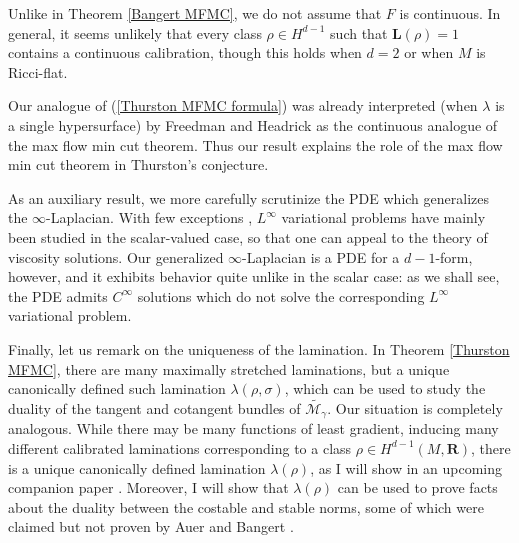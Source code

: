 \documentclass[reqno,11pt]{amsart}
\newcommand{\RR}{\mathbf{R}}
\newcommand{\Comass}{\mathbf L}
\theoremstyle{definition}
\numberwithin{equation}{section}
\begin{document}
Unlike in Theorem \ref{Bangert MFMC}, we do not assume that $F$ is continuous.
In general, it seems unlikely that every class $\rho \in H^{d - 1}$ such that $\Comass(\rho) = 1$ contains a continuous calibration, though this holds when $d = 2$ \cite{Evans08} or when $M$ is Ricci-flat.

Our analogue of (\ref{Thurston MFMC formula}) was already interpreted (when $\lambda$ is a single hypersurface) by Freedman and Headrick \cite{Freedman_2016} as the continuous analogue of the max flow min cut theorem.
Thus our result explains the role of the max flow min cut theorem in Thurston's conjecture.

As an auxiliary result, we more carefully scrutinize the PDE which generalizes the $\infty$-Laplacian.
With few exceptions \cite{Barron2001,Sheffield12,daskalopoulos2022}, $L^\infty$ variational problems have mainly been studied in the scalar-valued case, so that one can appeal to the theory of viscosity solutions.
Our generalized $\infty$-Laplacian is a PDE for a $d - 1$-form, however, and it exhibits behavior quite unlike in the scalar case: as we shall see, the PDE admits $C^\infty$ solutions which do not solve the corresponding $L^\infty$ variational problem.

Finally, let us remark on the uniqueness of the lamination.
In Theorem \ref{Thurston MFMC}, there are many maximally stretched laminations, but a unique canonically defined such lamination $\lambda(\rho, \sigma)$, which can be used to study the duality of the tangent and cotangent bundles of $\widetilde{\mathscr M_\gamma}$.
Our situation is completely analogous.
While there may be many functions of least gradient, inducing many different calibrated laminations corresponding to a class $\rho \in H^{d - 1}(M, \RR)$, there is a unique canonically defined lamination $\lambda(\rho)$, as I will show in an upcoming companion paper \cite{BackusBest2}.
Moreover, I will show that $\lambda(\rho)$ can be used to prove facts about the duality between the costable and stable norms, some of which were claimed but not proven by Auer and Bangert \cite{Auer01}.
\end{document}
